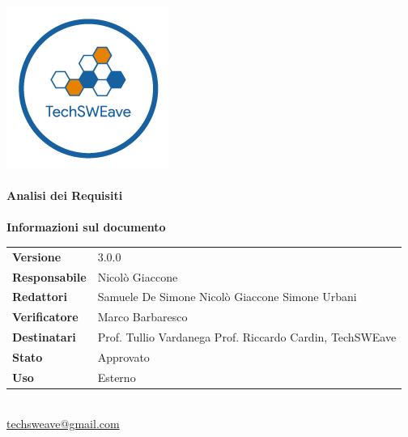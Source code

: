 \documentclass[a4paper]{article}
\begin{document}
\begin{titlepage}
    \begin{center}
        \includegraphics{../../../Images/logo.png}\\
        \vspace{20px}
        \textcolor{logo}{\hrulefill}\\
        \vspace{20px}
        \textbf{\huge\textcolor{logo}{Analisi dei Requisiti}}\\
        \vspace{10px}
        \textcolor{logo}{\hrulefill}\\
        \vspace{40px}
        \textbf{\Large Informazioni sul documento}\\
        \vspace{20px}
        \begin{tabular}{p{100px} | p{100px}}
            \textbf{Versione}     & 3.0.0                                                                      \\
            \textbf{Responsabile} & Nicolò Giaccone                                                            \\
            \textbf{Redattori}    & Samuele De Simone \newline Nicolò Giaccone \newline Simone Urbani          \\
            \textbf{Verificatore} & Marco Barbaresco                                                           \\
            \textbf{Destinatari}  & Prof. Tullio Vardanega \newline Prof. Riccardo Cardin, \newline TechSWEave \\
            \textbf{Stato}        & Approvato                                                                  \\
            \textbf{Uso}          & Esterno                                                                    \\
        \end{tabular}\\
        \vspace{60px}
        \href{mailto:techsweave@gmail.com}{techsweave@gmail.com}\\

    \end{center}
\end{titlepage}
\end{document}

